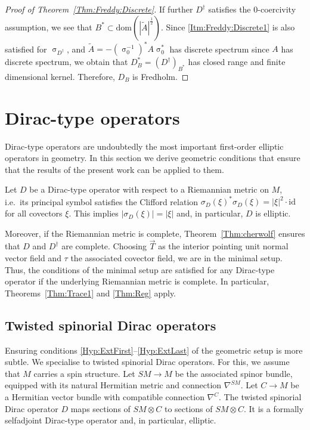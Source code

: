 \documentclass[a4paper,10pt,reqno]{amsart}
\newcommand{\sym}{\upsigma}
\newcommand{\id}{\mathrm{id}}
\newcommand{\modulus}[1]{|#1|}
\newcommand{\dom}{\mathrm{dom}}
\theoremstyle{definition}
\begin{document}
\begin{proof}[Proof of Theorem~\ref{Thm:Freddy:Discrete}]
If further $D^\dagger$ satisfies the $0$-coercivity assumption, we see that $B^* \subset \dom(\modulus{\tilde{A}}^{\frac12})$.
Since \ref{Itm:Freddy:Discrete1} is also satisfied for $\sym_{D^\dagger}$, and $\tilde{A} = -(\sym_0^{-1})^\ast A \sym_0^\ast$  has discrete spectrum since $A$ has discrete spectrum, we obtain that $D_B^\ast = (D^\dagger)_{B^*}$ has closed range and finite dimensional kernel.
Therefore, $D_B$ is Fredholm.
\end{proof}


\section{Dirac-type operators}
\label{Sec:DiracType}

Dirac-type operators are undoubtedly the most important first-order elliptic operators in geometry.
In this section we derive geometric conditions that ensure that the results of the present work can be applied to them.

Let $D$ be a Dirac-type operator with respect to a Riemannian metric on $M$, i.e.\ its principal symbol satisfies the Clifford relation $\sigma_D(\xi)^*\sigma_D(\xi) = |\xi|^2\cdot\id$ for all covectors $\xi$.
This implies $|\sigma_D(\xi)|=|\xi|$ and, in particular, $D$ is elliptic.

Moreover, if the Riemannian metric is complete, Theorem~\ref{Thm:cherwolf} ensures that $D$ and $D^\dagger$ are complete.
Choosing $\vec{T}$ as the interior pointing unit normal vector field and $\tau$ the associated covector field, we are in the minimal setup.
Thus, the conditions of the minimal setup are satisfied for any Dirac-type operator if the underlying Riemannian metric is complete.
In particular, Theorems~\ref{Thm:Trace1} and \ref{Thm:Reg} apply.

\subsection{Twisted spinorial Dirac operators}
Ensuring conditions \ref{Hyp:ExtFirst}--\ref{Hyp:ExtLast} of the geometric setup is more subtle.
We specialise to twisted spinorial Dirac operators.
For this, we assume that $M$ carries a spin structure.
Let $SM\to M$ be the associated spinor bundle, equipped with its natural Hermitian metric and connection $\nabla^{SM}$.
Let $C\to M$ be a Hermitian vector bundle with compatible connection $\nabla^C$.
The twisted spinorial Dirac operator $D$ maps sections of $SM\otimes C$ to sections of $SM\otimes C$.
It is a formally selfadjoint Dirac-type operator and, in particular, elliptic.
\end{document}
